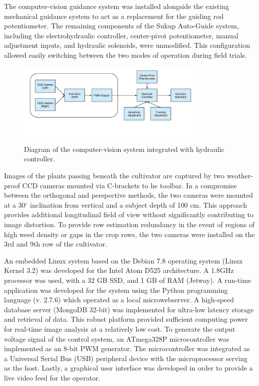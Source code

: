 \documentclass[authoryear]{elsarticle}
\begin{document}
The computer-vision guidance system was installed alongside the
existing mechanical guidance system to act as a replacement for the
guiding rod potentiometer. The remaining components of the Sukup
Auto-Guide system, including the electrohydraulic controller,
center-pivot potentiometer, manual adjustment inputs, and hydraulic
solenoids, were unmodified. This configuration allowed easily
switching between the two modes of operation during field trials.

\begin{figure}
  \centering
  \includegraphics[width=0.8\textwidth,natwidth=610,natheight=642]{agcv_diagram.png}
  \caption{Diagram of the computer-vision system integrated with hydraulic controller.}
\end{figure}

Images of the plants passing beneath the cultivator are captured by
two weather-proof CCD cameras mounted via C-brackets to he toolbar. 
In a compromise between the orthogonal and perspective
methods, the two cameras were mounted at a 30$^{\circ}$ inclination from
vertical and a subject depth of 100 cm. This approach provides
additional longitudinal field of view without significantly
contributing to image distortion. To provide row estimation redundancy
in the event of regions of high weed density or gaps in the crop rows,
the two cameras were installed on the 3rd and 9th row of the
cultivator.

An embedded Linux system based on the Debian 7.8 operating system
(Linux Kernel 3.2) was developed for the Intel Atom D525
architecture. A 1.8GHz processor was used, with a 32 GB SSD, and 1 GB
of RAM (Jetway). A run-time application was developed for the system
using the Python programming language (v. 2.7.6) which operated as a
local microwebserver. A high-speed database server (MongoDB 32-bit)
was implemented for ultra-low latency storage and retrieval of
data. This robust platform provided sufficient computing power for
real-time image analysis at a relatively low cost. To generate the
output voltage signal of the control system, an
ATmega328P microcontroller was implemented as an 8-bit PWM generator. The
microcontroller was integrated as a Universal Serial Bus (USB)
peripheral device with the microprocessor serving as the
host. Lastly, a graphical user interface was developed in order to provide a
live video feed for the operator.
\end{document}
